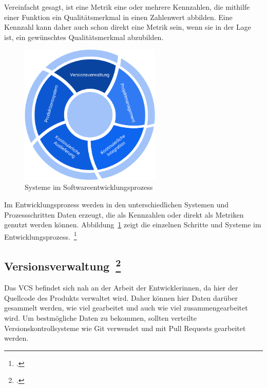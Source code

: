 Vereinfacht gesagt, ist eine Metrik eine oder mehrere Kennzahlen, die mithilfe einer Funktion ein Qualitätsmerkmal in einen Zahlenwert abbilden.
Eine Kennzahl kann daher auch schon direkt eine Metrik sein, wenn sie in der Lage ist, ein gewünschtes Qualitätsmerkmal abzubilden.

\begin{savenotes}
  \begin{figure}[H] 
    \centering
       \includegraphics[width=0.6\textwidth]{img/software-development-lifecycle.png}
    \caption[Systeme im Softwareentwicklungsprozess]{Systeme im Softwareentwicklungsprozess~\label{fig:sdlc}}
  \end{figure}
\end{savenotes}

Im Entwicklungsprozess werden in den unterschiedlichen Systemen und Prozessschritten Daten erzeugt, die als Kennzahlen oder direkt als Metriken genutzt werden können.
Abbildung~\ref{fig:sdlc} zeigt die einzelnen Schritte und Systeme im Entwicklungsprozess.~\footcite[vgl.][S.8]{davis_agile_2015}

\clearpage
\subsection[Versionsverwaltung]{Versionsverwaltung~\footcite[vgl.][S.62ff]{davis_agile_2015}}

Das \ac{VCS} befindet sich nah an der Arbeit der Entwicklerinnen, da hier der Quellcode des Produkts verwaltet wird.
Daher können hier Daten darüber gesammelt werden, wie viel gearbeitet und auch wie viel zusammengearbeitet wird.
Um bestmögliche Daten zu bekommen, sollten verteilte Versionskontrollsysteme wie Git verwendet und mit Pull Requests gearbeitet werden.

